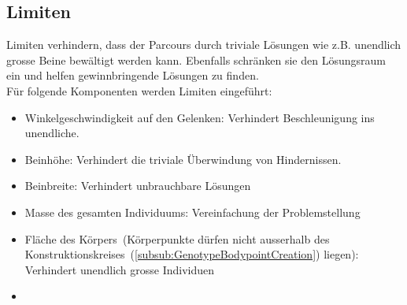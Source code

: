     \subsection{Limiten\label{sub:IntroReqLimit}}

      Limiten verhindern, dass der Parcours durch triviale Lösungen wie z.B. unendlich grosse Beine bewältigt werden kann.
      Ebenfalls schränken sie den Lösungsraum ein und helfen gewinnbringende Lösungen zu finden.
      \\
      Für folgende Komponenten werden Limiten eingeführt:

      \begin{itemize}
        \item Winkelgeschwindigkeit auf den Gelenken: Verhindert Beschleunigung ins unendliche.
        \item Beinhöhe: Verhindert die triviale Überwindung von Hindernissen.
        \item Beinbreite: Verhindert unbrauchbare Lösungen
        \item Masse des gesamten Individuums: Vereinfachung der Problemstellung
        \item Fläche des Körpers~(Körperpunkte dürfen nicht ausserhalb des Konstruktionskreises~(\vref{subsub:GenotypeBodypointCreation}) liegen): Verhindert unendlich grosse Individuen
        \item
      \end{itemize}
